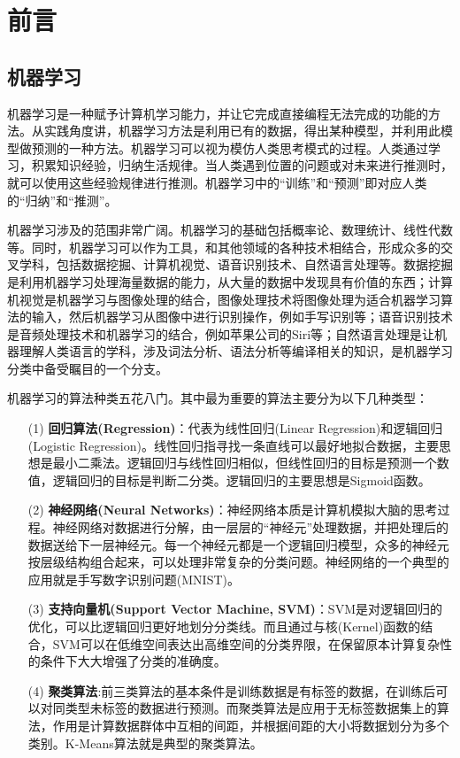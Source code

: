 
\chapter{前言}
\label{chap:preli}


\section{机器学习}

机器学习是一种赋予计算机学习能力，并让它完成直接编程无法完成的功能的方法。从实践角度讲，机器学习方法是利用已有的数据，得出某种模型，并利用此模型做预测的一种方法。机器学习可以视为模仿人类思考模式的过程。人类通过学习，积累知识经验，归纳生活规律。当人类遇到位置的问题或对未来进行推测时，就可以使用这些经验规律进行推测。机器学习中的“训练”和“预测”即对应人类的“归纳”和“推测”。

机器学习涉及的范围非常广阔。机器学习的基础包括概率论、数理统计、线性代数等。同时，机器学习可以作为工具，和其他领域的各种技术相结合，形成众多的交叉学科，包括数据挖掘、计算机视觉、语音识别技术、自然语言处理等。数据挖掘是利用机器学习处理海量数据的能力，从大量的数据中发现具有价值的东西；计算机视觉是机器学习与图像处理的结合，图像处理技术将图像处理为适合机器学习算法的输入，然后机器学习从图像中进行识别操作，例如手写识别等；语音识别技术是音频处理技术和机器学习的结合，例如苹果公司的Siri等；自然语言处理是让机器理解人类语言的学科，涉及词法分析、语法分析等编译相关的知识，是机器学习分类中备受瞩目的一个分支。

机器学习的算法种类五花八门。其中最为重要的算法主要分为以下几种类型：

\begin{enumerate}
	\item [(1)] \textbf{回归算法(Regression)}：代表为线性回归(Linear Regression)和逻辑回归(Logistic Regression)。线性回归指寻找一条直线可以最好地拟合数据，主要思想是最小二乘法。逻辑回归与线性回归相似，但线性回归的目标是预测一个数值，逻辑回归的目标是判断二分类。逻辑回归的主要思想是Sigmoid函数。
	\item [(2)] \textbf{神经网络(Neural Networks)}：神经网络本质是计算机模拟大脑的思考过程。神经网络对数据进行分解，由一层层的“神经元”处理数据，并把处理后的数据送给下一层神经元。每一个神经元都是一个逻辑回归模型，众多的神经元按层级结构组合起来，可以处理非常复杂的分类问题。神经网络的一个典型的应用就是手写数字识别问题(MNIST)。
	\item [(3)] \textbf{支持向量机(Support Vector Machine, SVM)}：SVM是对逻辑回归的优化，可以比逻辑回归更好地划分分类线。而且通过与核(Kernel)函数的结合，SVM可以在低维空间表达出高维空间的分类界限，在保留原本计算复杂性的条件下大大增强了分类的准确度。
	\item [(4)] \textbf{聚类算法}:前三类算法的基本条件是训练数据是有标签的数据，在训练后可以对同类型未标签的数据进行预测。而聚类算法是应用于无标签数据集上的算法，作用是计算数据群体中互相的间距，并根据间距的大小将数据划分为多个类别。K-Means算法就是典型的聚类算法。
\end{enumerate}

